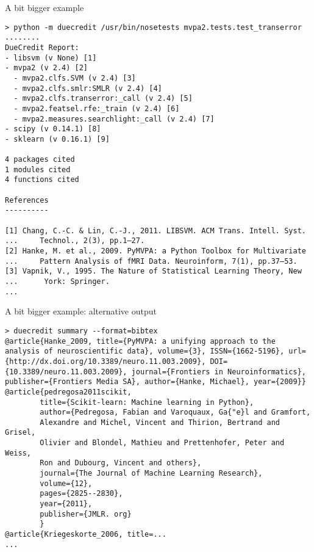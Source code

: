 \begin{frame}[t,fragile]{A bit bigger example}
\begin{Verbatim}[commandchars=\\\{\},fontsize=\scriptsize]
> python -m duecredit /usr/bin/nosetests mvpa2.tests.test_transerror
........
DueCredit Report:
- libsvm (v None) [1]
- mvpa2 (v 2.4) [2]
  - mvpa2.clfs.SVM (v 2.4) [3]
  - mvpa2.clfs.smlr:SMLR (v 2.4) [4]
  - mvpa2.clfs.transerror:_call (v 2.4) [5]
  - mvpa2.featsel.rfe:_train (v 2.4) [6]
  - mvpa2.measures.searchlight:_call (v 2.4) [7]
- scipy (v 0.14.1) [8]
- sklearn (v 0.16.1) [9]

4 packages cited
1 modules cited
4 functions cited

References
----------

[1] Chang, C.-C. & Lin, C.-J., 2011. LIBSVM. ACM Trans. Intell. Syst. ...     Technol., 2(3), pp.1–27.
[2] Hanke, M. et al., 2009. PyMVPA: a Python Toolbox for Multivariate ...     Pattern Analysis of fMRI Data. Neuroinform, 7(1), pp.37–53.
[3] Vapnik, V., 1995. The Nature of Statistical Learning Theory, New ...      York: Springer.
...
\end{Verbatim}
\end{frame}

\begin{frame}[t,fragile]{A bit bigger example: alternative output}
\begin{Verbatim}[fontsize=\scriptsize]
> duecredit summary --format=bibtex
@article{Hanke_2009, title={PyMVPA: a unifying approach to the analysis of neuroscientific data}, volume={3}, ISSN={1662-5196}, url={http://dx.doi.org/10.3389/neuro.11.003.2009}, DOI={10.3389/neuro.11.003.2009}, journal={Frontiers in Neuroinformatics}, publisher={Frontiers Media SA}, author={Hanke, Michael}, year={2009}}
@article{pedregosa2011scikit,
        title={Scikit-learn: Machine learning in Python},
        author={Pedregosa, Fabian and Varoquaux, Ga{"e}l and Gramfort,
        Alexandre and Michel, Vincent and Thirion, Bertrand and Grisel,
        Olivier and Blondel, Mathieu and Prettenhofer, Peter and Weiss,
        Ron and Dubourg, Vincent and others},
        journal={The Journal of Machine Learning Research},
        volume={12},
        pages={2825--2830},
        year={2011},
        publisher={JMLR. org}
        }
@article{Kriegeskorte_2006, title=...
...
\end{Verbatim}
\end{frame}


